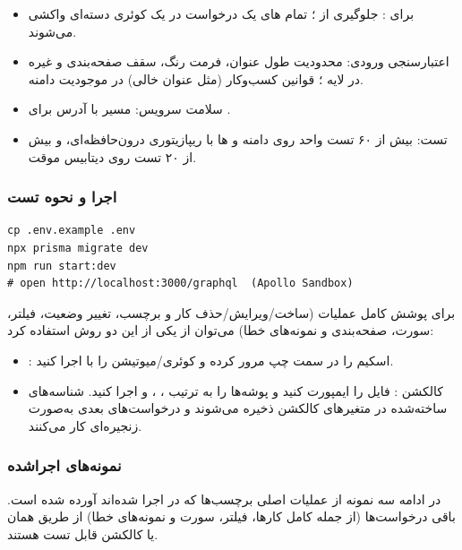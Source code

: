 \begin{itemize}
    \item { برای :} جلوگیری از ؛ تمام های یک درخواست در یک کوئری دسته‌ای واکشی می‌شوند.
    \item {اعتبارسنجی ورودی:} محدودیت طول عنوان، فرمت رنگ، سقف صفحه‌بندی و غیره در لایه ؛ قوانین کسب‌وکار (مثل عنوان خالی) در موجودیت دامنه.
    \item {سلامت سرویس:} مسیر  با آدرس  برای .
    \item {تست:} بیش از ۶۰ تست واحد روی دامنه و ها با ریپازیتوری درون‌حافظه‌ای، و بیش از ۲۰ تست  روی دیتابیس موقت.
\end{itemize}

\subsubsection*{اجرا و نحوه تست}

\begin{latin}
\begin{lstlisting}[language={},basicstyle=\ttfamily\footnotesize]
cp .env.example .env
npx prisma migrate dev
npm run start:dev
# open http://localhost:3000/graphql  (Apollo Sandbox)
\end{lstlisting}
\end{latin}

برای پوشش کامل عملیات (ساخت/ویرایش/حذف کار و برچسب، تغییر وضعیت، فیلتر، سورت، صفحه‌بندی و نمونه‌های خطا) می‌توان از یکی از این دو روش استفاده کرد:
\begin{itemize}
    \item {:} اسکیم را در سمت چپ مرور کرده و کوئری/میوتیشن را با  اجرا کنید.
    \item {کالکشن :} فایل  را ایمپورت کنید و پوشه‌ها را به ترتیب ، ،  و  اجرا کنید. شناسه‌های ساخته‌شده در متغیرهای کالکشن ذخیره می‌شوند و درخواست‌های بعدی به‌صورت زنجیره‌ای کار می‌کنند.
\end{itemize}

\subsubsection*{نمونه‌های اجراشده}

در ادامه سه نمونه از عملیات اصلی برچسب‌ها که در  اجرا شده‌اند آورده شده است. باقی درخواست‌ها (از جمله  کامل کارها، فیلتر، سورت و نمونه‌های خطا) از طریق همان  یا کالکشن  قابل تست هستند.

